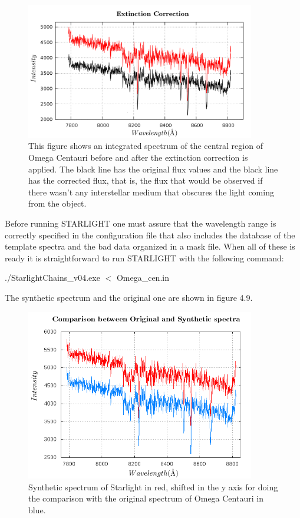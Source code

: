 \begin{figure}[H]
\centering
\includegraphics[width=10cm]{images/extinction.png}
\caption[Extinction Correction]{This figure shows an integrated spectrum of the central region of Omega Centauri before and after the extinction correction is applied. The black line has the original flux values and the black line has the corrected flux, that is, the flux that would be observed if there wasn't any interstellar medium that obscures the light coming from the object.}
\end{figure}

Before running STARLIGHT one must assure that the wavelength range is correctly specified in the configuration file that also includes the database of the template spectra and the bad data organized in a mask file. When all of these is ready it is straightforward to run STARLIGHT with the following command:

\begin{center}
./StarlightChains\_v04.exe $<$ Omega\_cen.in
\end{center}

The synthetic spectrum and the original one are shown in figure 4.9.

\begin{figure}[H]
\centering
\includegraphics[width=10cm]{images/comparison.png}
\caption[Synthetic spectrum of STARLIGHT]{Synthetic spectrum of Starlight in red, shifted in the y axis for doing the comparison with the original spectrum of Omega Centauri in blue.}
\end{figure}
 
